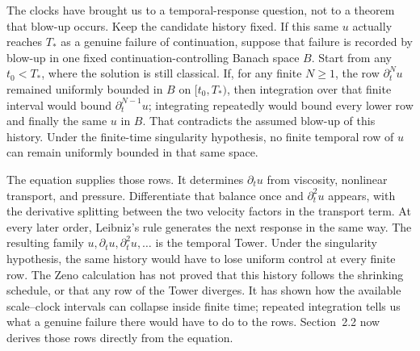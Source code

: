 The clocks have brought us to a temporal-response question, not to a theorem that blow-up occurs.
Keep the candidate history fixed.
If this same \(u\) actually reaches \(T_*\) as a genuine failure of continuation, suppose that failure is recorded by blow-up in one fixed continuation-controlling Banach space \(B\).
Start from any \(t_0<T_*\), where the solution is still classical.
If, for any finite \(N\geq1\), the row \(\partial_t^N u\) remained uniformly bounded in \(B\) on \([t_0,T_*)\), then integration over that finite interval would bound \(\partial_t^{N-1}u\); integrating repeatedly would bound every lower row and finally the same \(u\) in \(B\).
That contradicts the assumed blow-up of this history.
Under the finite-time singularity hypothesis, no finite temporal row of \(u\) can remain uniformly bounded in that same space.

The \NavierStokes{} equation supplies those rows.
It determines \(\partial_tu\) from viscosity, nonlinear transport, and pressure.
Differentiate that balance once and \(\partial_t^2u\) appears, with the derivative splitting between the two velocity factors in the transport term.
At every later order, Leibniz's rule generates the next response in the same way.
The resulting family \(u,\partial_tu,\partial_t^2u,\ldots\) is the temporal Tower.
Under the singularity hypothesis, the same history would have to lose uniform control at every finite row.
The Zeno calculation has not proved that this history follows the shrinking schedule, or that any row of the Tower diverges.
It has shown how the available scale--clock intervals can collapse inside finite time; repeated integration tells us what a genuine failure there would have to do to the rows.
Section~2.2 now derives those rows directly from the equation.
